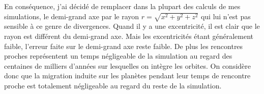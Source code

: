 En conséquence, j'ai décidé de remplacer dans la plupart des calculs de mes simulations, le demi-grand axe par le rayon $r=\sqrt{x^2+y^2+z^2}$ qui lui n'est pas sensible à ce genre de divergences. Quand il y a une excentricité, il est clair que le rayon est différent du demi-grand axe. Mais les excentricités étant généralement faible, l'erreur faite sur le demi-grand axe reste faible. De plus les rencontres proches représentent un temps négligeable de la simulation au regard des centaines de milliers d'années sur lesquelles on intègre les orbites. On considère donc que la migration induite sur les planètes pendant leur temps de rencontre proche est totalement négligeable au regard du reste de la simulation.



